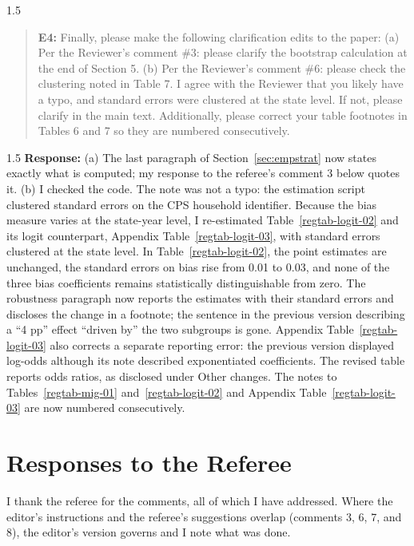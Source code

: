 \documentclass[12pt,english]{article}
\newcommand{\rrxspc}{1.5}
\begin{document}
\begin{refsection}
    \begin{spacing}{\rrxspc}
            \begin{quotation}
                \textbf{E4: } Finally, please make the following clarification edits to the paper: (a) Per the Reviewer's comment \#3: please clarify the bootstrap calculation at the end of Section 5. (b) Per the Reviewer's comment \#6: please check the clustering noted in Table 7. I agree with the Reviewer that you likely have a typo, and standard errors were clustered at the state level. If not, please clarify in the main text. Additionally, please correct your table footnotes in Tables 6 and 7 so they are numbered consecutively.
            \end{quotation}
        \end{spacing}
        \begin{spacing}{\rrxspc}
        \textbf{Response:} (a) The last paragraph of Section~\ref{sec:empstrat} now states exactly what is computed; my response to the referee's comment 3 below quotes it. (b) I checked the code. The note was not a typo: the estimation script clustered standard errors on the CPS household identifier. Because the bias measure varies at the state-year level, I re-estimated Table~\ref{regtab-logit-02} and its logit counterpart, Appendix Table~\ref{regtab-logit-03}, with standard errors clustered at the state level. In Table~\ref{regtab-logit-02}, the point estimates are unchanged, the standard errors on bias rise from 0.01 to 0.03, and none of the three bias coefficients remains statistically distinguishable from zero. The robustness paragraph now reports the estimates with their standard errors and discloses the change in a footnote; the sentence in the previous version describing a ``4 pp'' effect ``driven by'' the two subgroups is gone. Appendix Table~\ref{regtab-logit-03} also corrects a separate reporting error: the previous version displayed log-odds although its note described exponentiated coefficients. The revised table reports odds ratios, as disclosed under Other changes. The notes to Tables~\ref{regtab-mig-01} and~\ref{regtab-logit-02} and Appendix Table~\ref{regtab-logit-03} are now numbered consecutively.
    \end{spacing}

    \clearpage
    \pagebreak

    \section{Responses to the Referee}
    I thank the referee for the comments, all of which I have addressed. Where the editor's instructions and the referee's suggestions overlap (comments 3, 6, 7, and 8), the editor's version governs and I note what was done.


\end{refsection}
\end{document}
